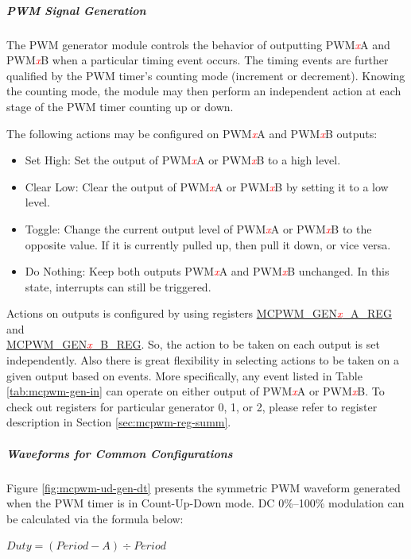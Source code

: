 \documentclass[main\_\_EN.tex]{subfiles}
\begin{document}
\subparagraph{PWM Signal Generation}
The PWM generator module controls the behavior of outputting PWM\textcolor{red}{\it{x}}A and PWM\textcolor{red}{\it{x}}B when a particular timing event occurs. The timing events are further qualified by the PWM timer's counting mode (increment or decrement). Knowing the counting mode, the module may then perform an independent action at each stage of the PWM timer counting up or down. 

The following actions may be configured on PWM\textcolor{red}{\it{x}}A and PWM\textcolor{red}{\it{x}}B outputs: 
\begin{itemize}
    \item Set High: Set the output of PWM\textcolor{red}{\it{x}}A or PWM\textcolor{red}{\it{x}}B to a high level. 
    \item Clear Low: Clear the output of PWM\textcolor{red}{\it{x}}A or PWM\textcolor{red}{\it{x}}B by setting it to a low level.
    \item Toggle: Change the current output level of PWM\textcolor{red}{\it{x}}A or PWM\textcolor{red}{\it{x}}B to the opposite value. If it is currently pulled up, then pull it down, or vice versa. 
    \item Do Nothing: Keep both outputs PWM\textcolor{red}{\it{x}}A and PWM\textcolor{red}{\it{x}}B unchanged. In this state, interrupts can still be triggered.
\end{itemize}

Actions on outputs is configured by using registers \hyperref[regdesc:MCPWMGEN0AREG]{MCPWM\_GEN\textcolor{red}{\it{x}}\_A\_REG} and \\\hyperref[regdesc:MCPWMGEN0BREG]{MCPWM\_GEN\textcolor{red}{\it{x}}\_B\_REG}. So, the action to be taken on each output is set independently. Also there is great flexibility in selecting actions to be taken on a given output based on events. More specifically, any event listed in Table \ref{tab:mcpwm-gen-in} can operate on either output of PWM\textcolor{red}{\it{x}}A or PWM\textcolor{red}{\it{x}}B. To check out registers for particular generator 0, 1, or 2, please refer to register description in Section \ref{sec:mcpwm-reg-summ}.

\subparagraph{Waveforms for Common Configurations}
Figure \ref{fig:mcpwm-ud-gen-dt} presents the symmetric PWM waveform generated when the PWM timer is in Count-Up-Down mode. DC 0\%–100\% modulation can be calculated via the formula below:

\begin{center}
$Duty =  (Period - A) \div Period$
\end{center}
\end{document}
